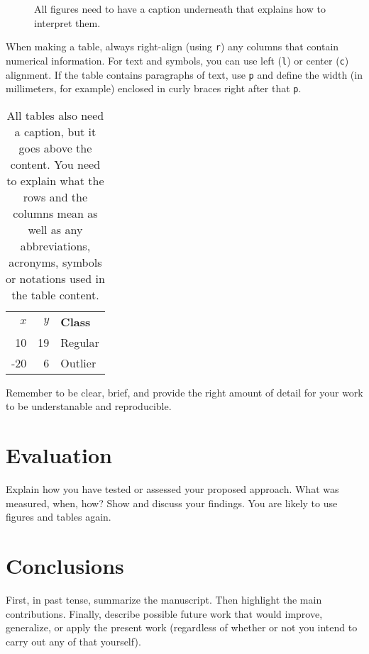 \documentclass{article}
\begin{document}
\begin{figure}
  \begin{center}
  \end{center}
  \caption{All figures need to have a caption underneath that explains
    how to interpret them.}
  \label{circle}
\end{figure}

When making a table, always right-align (using \texttt{r}) any columns
that contain numerical information. For text and symbols, you can use
left (\texttt{l}) or center (\texttt{c}) alignment. If the table
contains paragraphs of text, use \texttt{p} and define the width (in
millimeters, for example) enclosed in curly braces right after that
\texttt{p}.

\begin{table}
  \caption{All tables also need a caption, but it goes above the content. You need to explain what the rows and the columns mean as well as any abbreviations, acronyms, symbols or notations used in the table content.}
  \label{data}
  \begin{center}
    \begin{tabular}{r|r|l} %
      $x$ & $y$ & {\bf Class} \\
      10 & 19 & Regular \\
      -20 & 6 & Outlier
    \end{tabular}
  \end{center}
\end{table}

Remember to be clear, brief, and provide the right amount of detail
for your work to be understanable and reproducible.

\section{Evaluation}
\label{eval}

Explain how you have tested or assessed your proposed approach. What
was measured, when, how? Show and discuss your findings. You are
likely to use figures and tables again.

\section{Conclusions}
\label{conc}

First, in past tense, summarize the manuscript. Then highlight the
main contributions. Finally, describe possible future work that would
improve, generalize, or apply the present work (regardless of whether
or not you intend to carry out any of that yourself).



\end{document}
